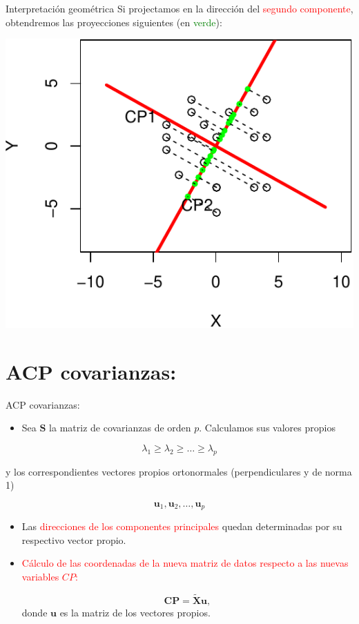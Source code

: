 \documentclass[
  ignorenonframetext,
]{beamer}
\providecommand{\tightlist}{%
  \setlength{\itemsep}{0pt}\setlength{\parskip}{0pt}}
\newcommand\red[1]{\textcolor{red}{#1}}
\newcommand\green[1]{\textcolor{green}{#1}}
\begin{document}
\begin{frame}{Interpretación geométrica}
\protect\hypertarget{interpretaciuxf3n-geomuxe9trica-3}{}
Si projectamos en la dirección del \red{segundo componente}, obtendremos
las proyecciones siguientes (en \green{verde}):

\begin{center}\includegraphics{AnalisisComponentesPrincipales_fusion_files/figure-beamer/inter4.1-1} \end{center}
\end{frame}

\hypertarget{acp-covarianzas}{%
\section{ACP covarianzas:}\label{acp-covarianzas}}

\begin{frame}{ACP covarianzas:}
\protect\hypertarget{acp-covarianzas-1}{}
\begin{itemize}
\tightlist
\item
  Sea \(\mathbf{S}\) la matriz de covarianzas de orden \(p\). Calculamos
  sus valores propios
\end{itemize}

\[\lambda_1\geq \lambda_2\geq\ldots\geq\lambda_p\]

y los correspondientes vectores propios ortonormales (perpendiculares y
de norma 1)

\[\mathbf{u}_1,\mathbf{u}_2,\ldots,\mathbf{u}_p\]

\begin{itemize}
\item
  Las \red{direcciones de los componentes principales} quedan
  determinadas por su respectivo vector propio.
\item
  \red{Cálculo de las coordenadas de la nueva matriz de datos respecto
  a las nuevas variables $CP$:}

  \[\mathbf{CP}= \tilde{\mathbf{X}} \mathbf{u},\] donde \(\mathbf{u}\)
  es la matriz de los vectores propios.
\end{itemize}
\end{frame}
\end{document}

